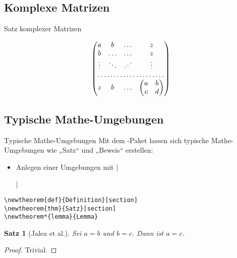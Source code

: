 \documentclass[
	vorläufig=false,
	datum=2022-11-09,
	titel={Mathematiksatz},
	web=false,
	max,
	aspectratio=1610,
]{../tex/latexkurs-slides}
\begin{document}
\subsection{Komplexe Matrizen}
\begin{frame}[fragile]{Satz komplexer Matrizen}
\begin{LTXexample}[width=.4\textwidth]
\[
\begin{pmatrix}
  a & b     & \dots & z\\
  b & \dots & \dots & z\\
  \vdots & \ddots& \reflectbox{\(\ddots\)} 
                              & \vdots\\
  \hdotsfor{4}\\
  z & b & \dots &
      \begin{pmatrix}
        a & b \\ c & d
      \end{pmatrix}
\end{pmatrix}
\]

\end{LTXexample}
\end{frame}


\subsection{Typische Mathe-Umgebungen}
\begin{frame}[fragile]{Typische Mathe-Umgebungen}%
Mit dem \AmS-Paket  lassen sich typische Mathe-Umgebungen wie „Satz“ und „Beweis“ erstellen:
\begin{itemize}
\item Anlegen einer Umgebungen mit |\newtheorem{|\meta{Kürzel}|}{||}[|\meta{Nummerierungsebene}|]|
\end{itemize}
\begin{lstlisting}
\newtheorem{def}{Definition}[section]
\newtheorem{thm}{Satz}[section]
\newtheorem*{lemma}{Lemma}
\end{lstlisting}
\newtheorem{thm}{Satz}[section]
\begin{LTXexample}
\begin{thm}[Jalea et al.]
  Sei \(a=b\) und \(b=c\). Dann ist \(a=c\).
\end{thm}
\begin{proof}
  Trivial.
\end{proof}
\end{LTXexample}
\end{frame}
\end{document}
